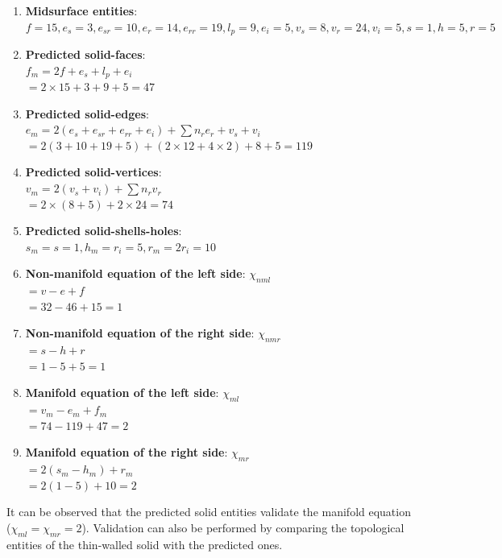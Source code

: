\begin{enumerate}
[noitemsep,topsep=2pt,parsep=2pt,partopsep=2pt,label=\textbullet]
\item \textbf{Midsurface entities}: \\$f = 15, e_s = 3, e_{sr} = 10, e_r = 14, e_{rr} = 19, l_p = 9 ,e_i=5,v_s = 8,v_r =24, v_i= 5, s=1,h=5,r=5$
\item \textbf{Predicted solid-faces}: \\$f_m = 2f+e_s+ l_p +e_i $\\$= 2 \times 15 + 3 + 9 + 5 = 47$
\item \textbf{Predicted solid-edges}: \\ $e_m = 2(e_s+e_{sr}+e_{rr}+e_i )+ \sum n_{r} e_{r}+v_s+v_i $\\$= 2(3+10+19 + 5)+ (2\times 12 + 4 \times 2)+8+5 = 119$
\item \textbf{Predicted solid-vertices}: \\$v_m = 2(v_s+ v_i) + \sum n_{r} v_r$\\$=2\times (8 + 5)  + 2 \times 24=74$
\item \textbf{Predicted solid-shells-holes}: \\$s_m =s = 1, h_m = r_i  = 5, r_m = 2r_i = 10$
\item \textbf{Non-manifold equation of the left side}:  $\chi_{nml} $\\$= v-e+f $\\$= 32-46+15 = 1$
\item \textbf{Non-manifold equation of the  right side}:  $\chi_{nmr}$\\$=s-h+r$\\$=1-5+5 = 1$
\item \textbf{Manifold equation of the  left side}:  $\chi_{ml} $\\$= v_m-e_m+f_m $\\$=74-119+47= 2$
\item \textbf{Manifold equation of the  right side}:  $\chi_{mr}$\\$=2(s_m-h_m )+r_m$\\$= 2(1-5)+10 = 2$
\end{enumerate}
It can be observed that the predicted solid entities validate the manifold equation ($\chi_{ml} = \chi_{mr} = 2$). Validation can also be performed by comparing the  topological entities of the thin-walled solid with the predicted ones.
